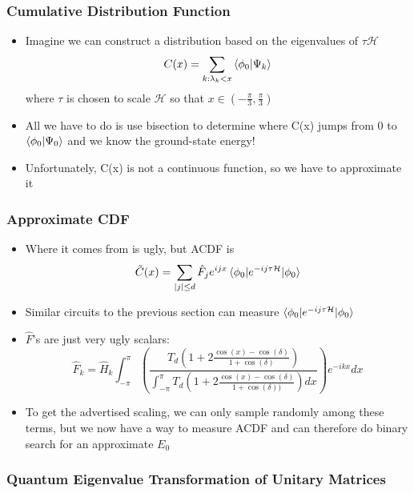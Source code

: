 \documentclass[aspectratio=169]{beamer}
\begin{document}
\begin{frame}
\frametitle{Cumulative Distribution Function}
\begin{itemize}[<+->]
\item Imagine we can construct a distribution based on the eigenvalues of $\tau\mathcal{H}$
\begin{equation}\nonumber
C(x) = \sum_{k:\lambda_k<x}\braket{\phi_0|\Psi_k}
\end{equation}
where $\tau$ is chosen to scale $\mathcal{H}$ so that $x\in (-\frac{\pi}{3},\frac{\pi}{3})$
\item All we have to do is use bisection to determine where C(x) jumps from 0 to $\braket{\phi_0|\Psi_0}$ and we know the ground-state energy!
\item Unfortunately, C(x) is not a continuous function, so we have to approximate it
\end{itemize}
\end{frame}

\begin{frame}
\frametitle{Approximate CDF}
\begin{itemize}[<+->]
\item Where it comes from is ugly, but ACDF is
\begin{equation}\nonumber
\tilde{C}(x) = \sum_{|j|\leq d}\hat{F}_j e^{ijx}\braket{\phi_0|e^{-ij\tau \mathcal{H}}|\phi_0}
\end{equation}
\item Similar circuits to the previous section can measure $\braket{\phi_0|e^{-ij\tau\mathcal{H}}|\phi_0}$
\item $\hat{F}$'s are just very ugly scalars:
\begin{equation}
\hat{F}_k = \hat{H}_k \int_{-\pi}^{\pi}\left(\frac{T_d(1+2\frac{\cos(x)-\cos(\delta)}{1+\cos(\delta)})}{\int_{-\pi}^{\pi}T_d(1+2\frac{\cos(x)-\cos(\delta)}{1+\cos(\delta))})dx}\right)e^{-ikx}dx
\end{equation}
\item To get the advertised scaling, we can only sample randomly among these terms, but we now have a way to measure ACDF and can therefore do binary search for an approximate $E_0$ 
\end{itemize}
\end{frame}


\begin{frame}
\frametitle{Quantum Eigenvalue Transformation of Unitary Matrices}

\end{frame}
\end{document}
